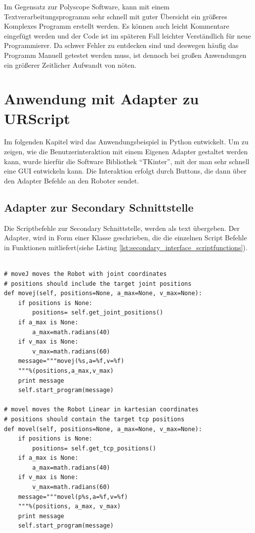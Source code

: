Im Gegensatz zur Polyscope Software, kann mit einem Textverarbeitungsprogramm sehr schnell mit guter Übersicht ein größeres Komplexes Programm erstellt werden. Es können auch leicht Kommentare eingefügt werden und der Code ist im späteren Fall leichter Verständlich für neue Programmierer. Da schwer Fehler zu entdecken sind und deswegen häufig das Programm Manuell getestet werden muss, ist dennoch bei großen Anwendungen ein größerer Zeitlicher Aufwandt von nöten.

\section{Anwendung mit Adapter zu URScript}
\label{sec:script_hoerherer_schicht_rel}

Im folgenden Kapitel wird das Anwendungsbeispiel in Python entwickelt. Um zu zeigen, wie die Benutzerinteraktion mit einem Eigenen Adapter gestaltet werden kann, wurde hierfür die \ac{Software Bibliothek} ``TKinter'', mit der man sehr schnell eine GUI entwickeln kann. Die Interaktion erfolgt durch Buttons, die dann über den Adapter Befehle an den Roboter sendet.

\subsection{Adapter zur Secondary Schnittstelle}
\label{beschreibung_script_hoeher_schicht}
Die Scriptbefehle zur Secondary Schnittstelle, werden als text übergeben. Der Adapter, wird in Form einer Klasse geschrieben, die die einzelnen Script Befehle in Funktionen mitliefert(siehe Listing \ref{lst:secondary_interface_scriptfunctions}).

\begin{lstlisting}[caption={Ausschnitt zeigt Funktionen die Scriptbefehle in der Adapter Klasse umgesetzt}, label=lst:urscipt_program_lst ,captionpos=b] 

# moveJ moves the Robot with joint coordinates
# positions should include the target joint positions
def movej(self, positions=None, a_max=None, v_max=None):
    if positions is None:
        positions= self.get_joint_positions()
    if a_max is None:
        a_max=math.radians(40)
    if v_max is None:
        v_max=math.radians(60)
    message="""movej(%s,a=%f,v=%f)
    """%(positions,a_max,v_max)
    print message
    self.start_program(message)

# movel moves the Robot Linear in kartesian coordinates
# positions should contain the target tcp positions
def movel(self, positions=None, a_max=None, v_max=None):
    if positions is None:
        positions= self.get_tcp_positions()
    if a_max is None:
        a_max=math.radians(40)
    if v_max is None:
        v_max=math.radians(60)
    message="""movel(p%s,a=%f,v=%f)
    """%(positions, a_max, v_max)
    print message
    self.start_program(message)
\end{lstlisting}

